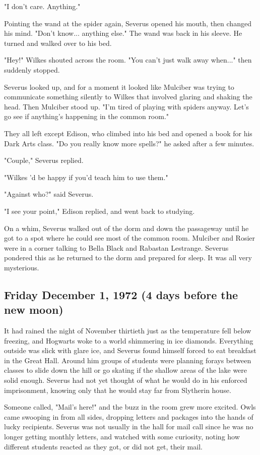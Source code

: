 \documentclass[a4paper,11pt]{article}
\begin{document}
"I don't care. Anything."

Pointing the wand at the spider again, Severus opened his mouth, then changed his mind. "Don't know... anything else." The wand was back in his sleeve. He turned and walked over to his bed.

"Hey!" Wilkes shouted across the room. "You can't just walk away when..." then suddenly stopped.

Severus looked up, and for a moment it looked like Mulciber was trying to communicate something silently to Wilkes that involved glaring and shaking the head. Then Mulciber stood up. "I'm tired of playing with spiders anyway. Let's go see if anything's happening in the common room."

They all left except Edison, who climbed into his bed and opened a book for his Dark Arts class. "Do you really know more spells?" he asked after a few minutes.

"Couple," Severus replied.

"Wilkes 'd be happy if you'd teach him to use them."

"Against who?" said Severus.

"I see your point," Edison replied, and went back to studying.

On a whim, Severus walked out of the dorm and down the passageway until he got to a spot where he could see most of the common room. Mulciber and Rosier were in a corner talking to Bella Black and Rabastan Lestrange. Severus pondered this as he returned to the dorm and prepared for sleep. It was all very mysterious.

\subsection{Friday December 1, 1972 (4 days before the new moon)}

It had rained the night of November thirtieth just as the temperature fell below freezing, and Hogwarts woke to a world shimmering in ice diamonds. Everything outside was slick with glare ice, and Severus found himself forced to eat breakfast in the Great Hall. Around him groups of students were planning forays between classes to slide down the hill or go skating if the shallow areas of the lake were solid enough. Severus had not yet thought of what he would do in his enforced imprisonment, knowing only that he would stay far from Slytherin house.

Someone called, "Mail's here!" and the buzz in the room grew more excited. Owls came swooping in from all sides, dropping letters and packages into the hands of lucky recipients. Severus was not usually in the hall for mail call since he was no longer getting monthly letters, and watched with some curiosity, noting how different students reacted as they got, or did not get, their mail.
\end{document}
